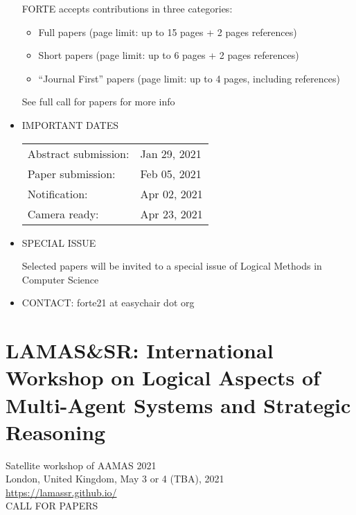 \documentclass{article}
\begin{document}
\begin{itemize}
  FORTE accepts contributions in three categories: 
 
\begin{itemize}\item  Full papers (page limit: up to 15 pages + 2 pages references)
\item  Short papers (page limit: up to 6 pages + 2 pages references) 
\item  ``Journal First'' papers (page limit: up to 4 pages, including references)
\end{itemize} 
  See full call for papers for more info 
 
\item  IMPORTANT DATES 
 
\begin{tabulary}{\linewidth}{LL}Abstract submission:  & Jan 29, 2021 \\
Paper submission:  & Feb 05, 2021 \\
Notification:  & Apr 02, 2021 \\
Camera ready:  & Apr 23, 2021 \\
\end{tabulary}
 
\item  SPECIAL ISSUE  
 
  Selected papers will be invited to a special issue of Logical Methods in Computer Science 
 
\item  CONTACT: forte21 at easychair dot org 
 
\end{itemize}\section{LAMAS\&SR: International Workshop on Logical Aspects of Multi-Agent Systems and Strategic Reasoning}\label{LAMASSR}  Satellite workshop of AAMAS 2021 \\ 
  London, United Kingdom, May 3 or 4 (TBA), 2021\\ 
  \href{https://lamassr.github.io/}{https://lamassr.github.io/}\\ 
CALL FOR PAPERS 
\end{document}
